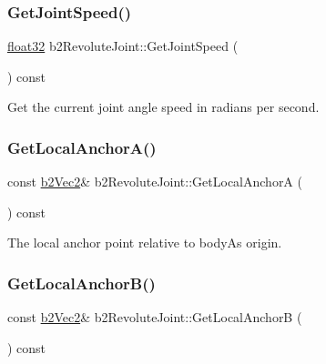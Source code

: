 \subsubsection{\texorpdfstring{GetJointSpeed()}{GetJointSpeed()}}
{\footnotesize\ttfamily \mbox{\hyperlink{b2_settings_8h_aacdc525d6f7bddb3ae95d5c311bd06a1}{float32}} b2\+Revolute\+Joint\+::\+Get\+Joint\+Speed (\begin{DoxyParamCaption}{ }\end{DoxyParamCaption}) const}



Get the current joint angle speed in radians per second. 

\mbox{\label{classb2_revolute_joint_af8cefd09d50a4e349613722809b8c823}} 
\subsubsection{\texorpdfstring{GetLocalAnchorA()}{GetLocalAnchorA()}}
{\footnotesize\ttfamily const \mbox{\hyperlink{structb2_vec2}{b2\+Vec2}}\& b2\+Revolute\+Joint\+::\+Get\+Local\+AnchorA (\begin{DoxyParamCaption}{ }\end{DoxyParamCaption}) const\hspace{0.3cm}{\ttfamily [inline]}}



The local anchor point relative to bodyA\textquotesingle{}s origin. 

\mbox{\label{classb2_revolute_joint_ac58e115df370181adc1ea1c486d84dc6}} 
\subsubsection{\texorpdfstring{GetLocalAnchorB()}{GetLocalAnchorB()}}
{\footnotesize\ttfamily const \mbox{\hyperlink{structb2_vec2}{b2\+Vec2}}\& b2\+Revolute\+Joint\+::\+Get\+Local\+AnchorB (\begin{DoxyParamCaption}{ }\end{DoxyParamCaption}) const\hspace{0.3cm}{\ttfamily [inline]}}



